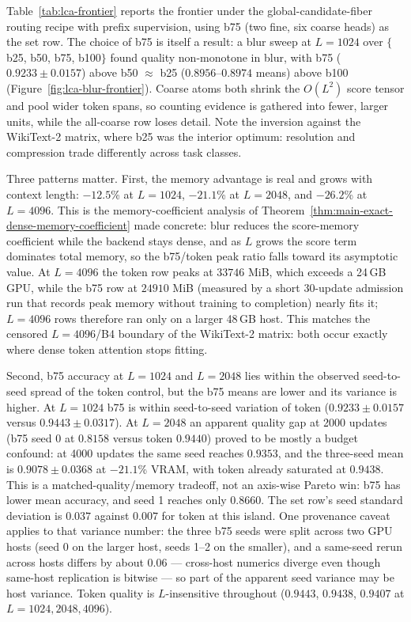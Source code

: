 \documentclass{article}
\theoremstyle{plain}
\theoremstyle{definition}
\theoremstyle{remark}
\begin{document}
Table~\ref{tab:lca-frontier} reports the frontier under the global-candidate-fiber
routing recipe with prefix supervision, using b75 (two fine, six
coarse heads) as the set row.  The
choice of b75 is itself a result: a blur sweep at $L=1024$ over
$\{$b25, b50, b75, b100$\}$ found quality non-monotone in blur, with
b75 ($0.9233\pm0.0157$) above b50 $\approx$ b25 ($0.8956$--$0.8974$ means)
above b100 (Figure~\ref{fig:lca-blur-frontier}).  Coarse atoms both shrink the $O(L^2)$ score tensor and pool
wider token spans, so counting evidence is gathered into fewer, larger
units, while the all-coarse row loses detail.
Note the inversion against the WikiText-2 matrix, where b25 was the interior
optimum: resolution and compression trade differently across task classes.



Three patterns matter.  First, the memory advantage is real and grows with
context length: $-12.5$\% at $L=1024$, $-21.1$\% at $L=2048$, and $-26.2$\% at
$L=4096$.  This is the memory-coefficient analysis of
Theorem~\ref{thm:main-exact-dense-memory-coefficient} made concrete: blur
reduces the score-memory coefficient while the backend stays dense, and as $L$
grows the score term dominates total memory, so the b75/token peak ratio falls
toward its asymptotic value.  At $L=4096$ the token row peaks at $33746$ MiB,
which exceeds a 24\,GB GPU, while the
b75 row at $24910$ MiB (measured by a short 30-update admission run that
records peak memory without training to completion) nearly fits it;
$L=4096$ rows therefore ran only on a larger 48\,GB host.  This matches the
censored $L=4096$/B4 boundary of the WikiText-2 matrix: both occur exactly
where dense token attention stops fitting.

Second, b75 accuracy at $L=1024$ and $L=2048$ lies within the observed
seed-to-seed spread of the token control, but the b75 means are lower and its
variance is higher.  At $L=1024$ b75 is within seed-to-seed variation of token
($0.9233\pm0.0157$ versus $0.9443\pm0.0317$).  At $L=2048$ an apparent quality
gap at 2000 updates (b75 seed 0 at $0.8158$ versus token $0.9440$) proved to
be mostly a budget confound: at 4000 updates the same seed reaches $0.9353$,
and the three-seed mean is $0.9078\pm0.0368$ at $-21.1$\% VRAM, with token
already saturated at $0.9438$.  This is a matched-quality/memory tradeoff, not
an axis-wise Pareto win: b75 has lower mean accuracy, and seed 1 reaches only
$0.8660$.  The set row's
seed standard deviation
is $0.037$ against $0.007$ for token at this island.  One provenance caveat
applies to that variance number: the three b75 seeds were split across two
GPU hosts (seed 0 on the larger host, seeds 1--2 on the smaller), and a
same-seed rerun across hosts differs by about $0.06$ --- cross-host numerics
diverge even though same-host replication is bitwise --- so part of the
apparent seed variance may be host variance.  Token quality is
$L$-insensitive throughout ($0.9443$, $0.9438$, $0.9407$ at
$L=1024,2048,4096$).
\end{document}
